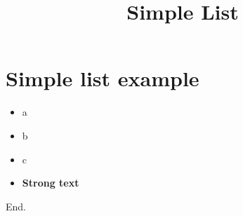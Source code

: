 \documentclass[a4paper,11pt,oneside,openany,report]{jsbook}
\title{Simple List}
\begin{document}
\maketitle
\chapter{Simple list example}\label{ch:Simplelistexample}
\begin{itemize}
\item a
\item b
\item c
\item \textbf{Strong text}
\end{itemize}End.
\end{document}
